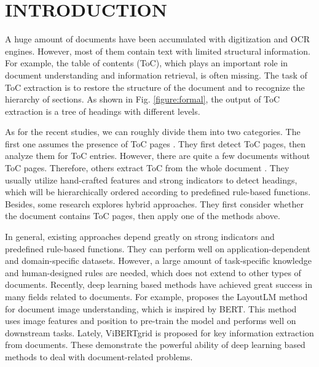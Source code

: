 \documentclass[a4paper,conference]{IEEEtran}
\begin{document}
\IEEEpeerreviewmaketitle


\section{INTRODUCTION}
A huge amount of documents have been accumulated with digitization and OCR engines. However, most of them contain text with limited structural information. For example, the table of contents (ToC), which plays an important role in document understanding and information retrieval, is often missing. The task of ToC extraction is to restore the structure of the document and to recognize the hierarchy of sections. As shown in Fig. \ref{figure:formal}, the output of ToC extraction is a tree of headings with different levels.

As for the recent studies, we can roughly divide them into two categories. The first one assumes the presence of ToC pages\cite{ 2020Tocpages } \cite{ 2017Tocpages}. They first detect ToC pages, then analyze them for ToC entries. However, there are quite a few documents without ToC pages\cite{noToC}. Therefore, others extract ToC from the whole document\cite{2018content} \cite{2007content}. They usually utilize hand-crafted features and strong indicators to detect headings, which will be hierarchically ordered according to predefined rule-based functions. Besides, some research explores hybrid approaches\cite{2015hybrid}. They first consider whether the document contains ToC pages, then apply one of the methods above.

In general, existing approaches depend greatly on strong indicators and predefined rule-based functions. They can perform well on application-dependent and domain-specific datasets. However, a large amount of task-specific knowledge and human-designed rules are needed, which does not extend to other types of documents. Recently, deep learning based methods have achieved great success in many fields related to documents. For example, \cite{layoutlm} proposes the LayoutLM method for document image understanding, which is inspired by BERT\cite{devlin2018bert}. This method uses image features and position to pre-train the model and performs well on downstream tasks. Lately, ViBERTgrid\cite{vibertgrid} is proposed for key information extraction from documents. These demonstrate the powerful ability of deep learning based methods to deal with document-related problems.
\end{document}
